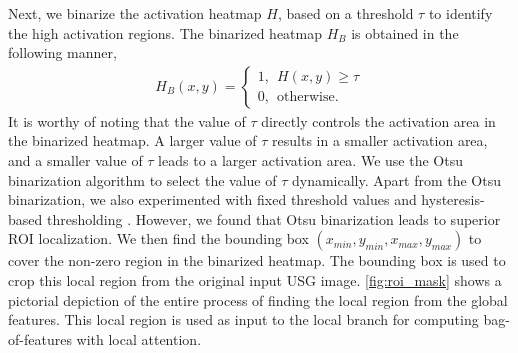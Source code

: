 \par Next, we binarize the activation heatmap $H$, based on a threshold $\tau$ to identify the high activation regions. The binarized heatmap $H_B$ is obtained in the following manner, 
%
\begin{align}
    H_B(x,y) = \begin{cases} 1,~~ H(x,y) \geq \tau \\ 0,~~ \text{otherwise}. \end{cases}
\end{align}
%
It is worthy of noting that the value of $\tau$ directly controls the activation area in the binarized heatmap. A larger value of $\tau$ results in a smaller activation area, and a smaller value of $\tau$ leads to a larger activation area. We use the Otsu binarization \cite{otsu1979threshold} algorithm to select the value of $\tau$ dynamically. Apart from the Otsu binarization, we also experimented with fixed threshold values and hysteresis-based thresholding \cite{canny1986computational}. However, we found that Otsu binarization leads to superior ROI localization. We then find the bounding box $(x_{min}, y_{min}, x_{max}, y_{max})$ to cover the non-zero region in the binarized heatmap. The bounding box is used to crop this local region from the original input USG image. \cref{fig:roi_mask} shows a pictorial depiction of the entire process of finding the local region from the global features. This local region is used as input to the local branch for computing bag-of-features with local attention. 

